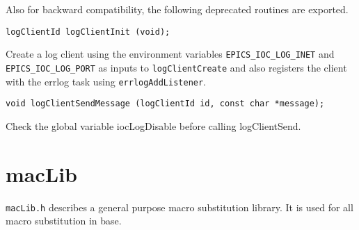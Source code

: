 Also for backward compatibility, the following deprecated routines are exported.

\begin{verbatim}
logClientId logClientInit (void);
\end{verbatim}

Create a log client using the environment variables \verb|EPICS_IOC_LOG_INET| and \verb|EPICS_IOC_LOG_PORT| as inputs to \verb|logClientCreate| and also registers the client with the errlog task using \verb|errlogAddListener|.

\begin{verbatim}
void logClientSendMessage (logClientId id, const char *message);
\end{verbatim}

Check the global variable iocLogDisable before calling logClientSend.

\section{macLib}

\verb|macLib.h| describes a general purpose macro substitution library.
It is used for all macro substitution in base.

